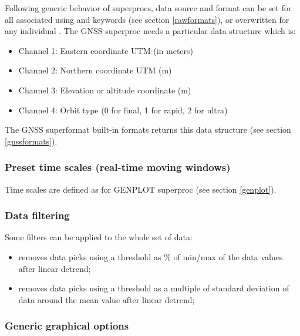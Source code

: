 Following generic behavior of superprocs, data source and format can be set for all associated  using  and  keywords (see section \ref{rawformats}), or overwritten for any individual . The GNSS superproc needs a particular data structure which is:
\begin{itemize}
\item Channel 1: Eastern coordinate UTM (in meters)
\item Channel 2: Northern coordinate UTM (m)
\item Channel 3: Elevation or altitude coordinate (m)
\item Channel 4: Orbit type (0 for final, 1 for rapid, 2 for ultra)
\end{itemize}

The GNSS superformat built-in formats returns this data structure (see section \ref{gnssformats}).

\subsubsection{Preset time scales (real-time moving windows)}

Time scales are defined as for GENPLOT superproc (see section \ref{genplot}).


\subsubsection{Data filtering}

Some filters can be applied to the whole set of data:
\begin{itemize}
	\item {} removes data picks using a threshold as \% of min/max of the data values after linear detrend;
	\item {} removes data picks using a threshold as a multiple of standard deviation of data around the mean value after linear detrend;
\end{itemize}


\subsubsection{Generic graphical options}

